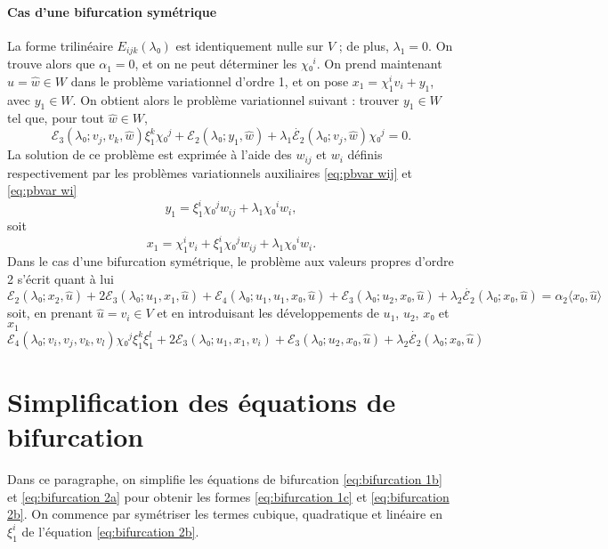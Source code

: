 \documentclass{article}
\begin{document}
\paragraph{Cas d'une bifurcation symétrique}La forme trilinéaire $E_{i
 j  k} (λ₀)$ est identiquement nulle sur $V$ ; de plus,
$λ_1 = 0$. On trouve alors que $α_1 = 0$, et on ne peut
déterminer les $\chi₀^i$. On prend maintenant $\hat{u} = \hat{w}∈W$
dans le problème variationnel d'ordre 1, et on pose $x_1 = \chi_1^i v_i +
y_1$, avec $y_1∈W$. On obtient alors le problème variationnel suivant
: trouver $y_1∈W$ tel que, pour tout $\hat{w}∈W$,
\begin{equation} ℰ_3 (λ₀ ; v_j, v_k, \hat{w}) ξ_1^k \chi₀^j
   +ℰ_2 (λ₀ ; y_1, \hat{w}) + λ_1  \dot{ℰ_2}
   (λ₀ ; v_j, \hat{w}) \chi₀^j = 0. \end{equation}
La solution de ce problème est exprimée à l'aide des $w_{i
 j}$ et $w_i$ définis respectivement par les problèmes
variationnels auxiliaires \eqref{eq:pbvar wij} et \eqref{eq:pbvar wi}
\begin{equation} y_1 = ξ_1^i \chi₀^j w_{i  j} + λ_1 \chi₀^i w_i, \end{equation}
soit
\begin{equation} x_1 = \chi_1^i v_i + ξ_1^i \chi₀^j w_{i  j} + λ_1 \chi₀^i
   w_i . \end{equation}
Dans le cas d'une bifurcation symétrique, le problème aux valeurs
propres d'ordre 2 s'écrit quant à lui
\begin{equation} ℰ_2 (λ₀ ; x_2, \hat{u}) + 2ℰ_3 (λ₀ ; u_1,
   x_1, \hat{u}) +ℰ_4  (λ₀ ; u_1, u_1, x₀, \hat{u})
   +ℰ_3 (λ₀ ; u_2, x₀, \hat{u}) + λ_2
   \dot{ℰ_2} (λ₀ ; x₀, \hat{u}) = α_2  \langle x₀,
   \hat{u} \rangle \end{equation}
soit, en prenant $\hat{u} = \widehat{v_i}∈V$ et en introduisant les
développements de $u_1$, $u_2$, $x₀ $ et $x_1$
\begin{equation} ℰ_4  (λ₀ ; v_i, v_j, v_k, v_l) \chi₀^j ξ_{1 }^k ξ_1^l
   + 2ℰ_3 (λ₀ ; u_1, x_1, v_i) +ℰ_3 (λ₀ ;
   u_2, x₀, \hat{u}) + λ_2  \dot{ℰ_2} (λ₀ ; x₀,
   \hat{u}) \end{equation}
\section{Simplification des équations de
bifurcation}\label{sec:Simplification des équations de bifurcation}

Dans ce paragraphe, on simplifie les équations de bifurcation
\eqref{eq:bifurcation 1b} et \eqref{eq:bifurcation 2a} pour obtenir les formes
\eqref{eq:bifurcation 1c} et \eqref{eq:bifurcation 2b}. On commence par
symétriser les termes cubique, quadratique et linéaire en $ξ_1^i$ de
l'équation \eqref{eq:bifurcation 2b}.
\end{document}
